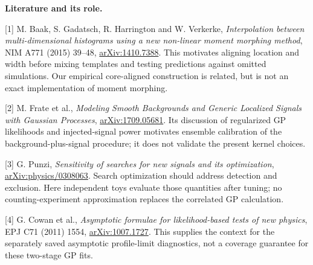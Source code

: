 \documentclass[11pt]{article}
\begin{document}
\textbf{Literature and its role.}

[1] M. Baak, S. Gadatsch, R. Harrington and W. Verkerke, \emph{Interpolation between multi-dimensional histograms using a new non-linear moment morphing method}, NIM A771 (2015) 39--48, \href{https://arxiv.org/abs/1410.7388}{arXiv:1410.7388}. This motivates aligning location and width before mixing templates and testing predictions against omitted simulations. Our empirical core-aligned construction is related, but is not an exact implementation of moment morphing.

[2] M. Frate et al., \emph{Modeling Smooth Backgrounds and Generic Localized Signals with Gaussian Processes}, \href{https://arxiv.org/abs/1709.05681}{arXiv:1709.05681}. Its discussion of regularized GP likelihoods and injected-signal power motivates ensemble calibration of the background-plus-signal procedure; it does not validate the present kernel choices.

[3] G. Punzi, \emph{Sensitivity of searches for new signals and its optimization}, \href{https://arxiv.org/abs/physics/0308063}{arXiv:physics/0308063}. Search optimization should address detection and exclusion. Here independent toys evaluate those quantities after tuning; no counting-experiment approximation replaces the correlated GP calculation.

[4] G. Cowan et al., \emph{Asymptotic formulae for likelihood-based tests of new physics}, EPJ C71 (2011) 1554, \href{https://arxiv.org/abs/1007.1727}{arXiv:1007.1727}. This supplies the context for the separately saved asymptotic profile-limit diagnostics, not a coverage guarantee for these two-stage GP fits.
\end{document}
